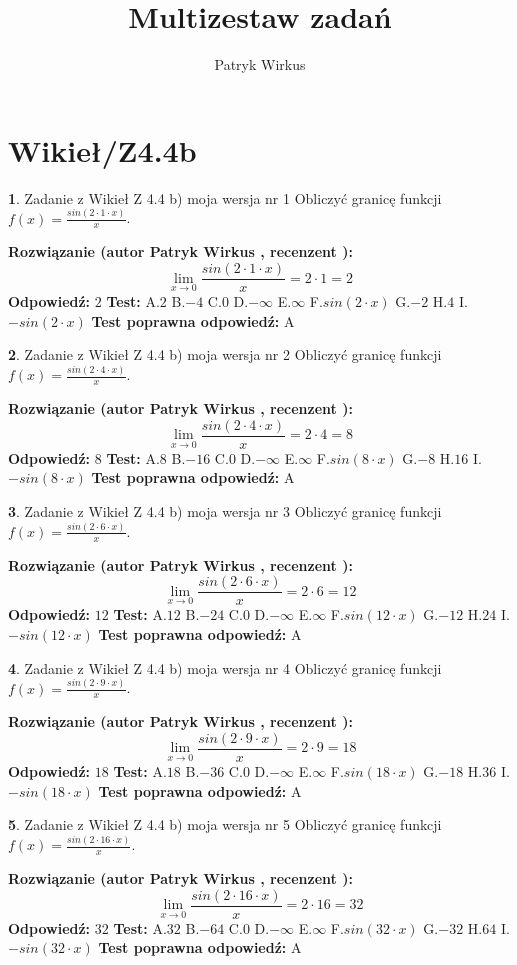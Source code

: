 \documentclass[12pt, a4paper]{article}
\title{Multizestaw zadań}
\author{Patryk Wirkus}
\date{}
\theoremstyle{definition} %
\newtheorem{zad}{}
\newcommand{\kategoria}[1]{\section{#1}}
\newcommand{\zadStart}[1]{\begin{zad}#1\newline}
\newcommand{\zadStop}{\end{zad}}
\newcommand{\rozwStart}[2]{\noindent \textbf{Rozwiązanie (autor #1 , recenzent #2): }\newline}
\newcommand{\rozwStop}{\newline}
\newcommand{\odpStart}{\noindent \textbf{Odpowiedź:}\newline}
\newcommand{\odpStop}{\newline}
\newcommand{\testStart}{\noindent \textbf{Test:}\newline}
\newcommand{\testStop}{\newline}
\newcommand{\kluczStart}{\noindent \textbf{Test poprawna odpowiedź:}\newline}
\newcommand{\kluczStop}{\newline}
\begin{document}
\maketitle

\kategoria{Wikieł/Z4.4b}


\zadStart{Zadanie z Wikieł Z 4.4 b) moja wersja nr 1}
Obliczyć granicę funkcji $f(x)=\frac{sin(2 \cdot1\cdot x)}{x}$.
\zadStop
\rozwStart{Patryk Wirkus}{}
$$\lim\limits_{x\to 0}\frac{sin(2 \cdot 1\cdot x)}{x}=
2 \cdot 1 = 2$$
\rozwStop
\odpStart
$2$
\odpStop
\testStart
A.$2$
B.$-4$
C.$0$
D.$-\infty$
E.$\infty$
F.$sin(2\cdot x)$
G.$-2$
H.$4$
I.$-sin(2\cdot x)$
\testStop
\kluczStart
A
\kluczStop



\zadStart{Zadanie z Wikieł Z 4.4 b) moja wersja nr 2}
Obliczyć granicę funkcji $f(x)=\frac{sin(2 \cdot4\cdot x)}{x}$.
\zadStop
\rozwStart{Patryk Wirkus}{}
$$\lim\limits_{x\to 0}\frac{sin(2 \cdot 4\cdot x)}{x}=
2 \cdot 4 = 8$$
\rozwStop
\odpStart
$8$
\odpStop
\testStart
A.$8$
B.$-16$
C.$0$
D.$-\infty$
E.$\infty$
F.$sin(8\cdot x)$
G.$-8$
H.$16$
I.$-sin(8\cdot x)$
\testStop
\kluczStart
A
\kluczStop



\zadStart{Zadanie z Wikieł Z 4.4 b) moja wersja nr 3}
Obliczyć granicę funkcji $f(x)=\frac{sin(2 \cdot6\cdot x)}{x}$.
\zadStop
\rozwStart{Patryk Wirkus}{}
$$\lim\limits_{x\to 0}\frac{sin(2 \cdot 6\cdot x)}{x}=
2 \cdot 6 = 12$$
\rozwStop
\odpStart
$12$
\odpStop
\testStart
A.$12$
B.$-24$
C.$0$
D.$-\infty$
E.$\infty$
F.$sin(12\cdot x)$
G.$-12$
H.$24$
I.$-sin(12\cdot x)$
\testStop
\kluczStart
A
\kluczStop



\zadStart{Zadanie z Wikieł Z 4.4 b) moja wersja nr 4}
Obliczyć granicę funkcji $f(x)=\frac{sin(2 \cdot9\cdot x)}{x}$.
\zadStop
\rozwStart{Patryk Wirkus}{}
$$\lim\limits_{x\to 0}\frac{sin(2 \cdot 9\cdot x)}{x}=
2 \cdot 9 = 18$$
\rozwStop
\odpStart
$18$
\odpStop
\testStart
A.$18$
B.$-36$
C.$0$
D.$-\infty$
E.$\infty$
F.$sin(18\cdot x)$
G.$-18$
H.$36$
I.$-sin(18\cdot x)$
\testStop
\kluczStart
A
\kluczStop



\zadStart{Zadanie z Wikieł Z 4.4 b) moja wersja nr 5}
Obliczyć granicę funkcji $f(x)=\frac{sin(2 \cdot16\cdot x)}{x}$.
\zadStop
\rozwStart{Patryk Wirkus}{}
$$\lim\limits_{x\to 0}\frac{sin(2 \cdot 16\cdot x)}{x}=
2 \cdot 16 = 32$$
\rozwStop
\odpStart
$32$
\odpStop
\testStart
A.$32$
B.$-64$
C.$0$
D.$-\infty$
E.$\infty$
F.$sin(32\cdot x)$
G.$-32$
H.$64$
I.$-sin(32\cdot x)$
\testStop
\kluczStart
A
\kluczStop
\end{document}
